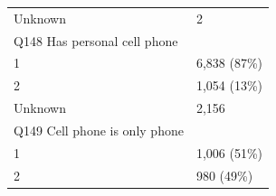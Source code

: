 \documentclass[]{article}
\begin{document}
\begin{longtable}[]{@{}ll@{}}
\begin{minipage}[t]{0.71\columnwidth}
Unknown\strut
\end{minipage} & \begin{minipage}[t]{0.23\columnwidth}\raggedright
2\strut
\end{minipage}\tabularnewline
\begin{minipage}[t]{0.71\columnwidth}\raggedright
Q148 Has personal cell phone\strut
\end{minipage} & \begin{minipage}[t]{0.23\columnwidth}\raggedright
\strut
\end{minipage}\tabularnewline
\begin{minipage}[t]{0.71\columnwidth}\raggedright
1\strut
\end{minipage} & \begin{minipage}[t]{0.23\columnwidth}\raggedright
6,838 (87\%)\strut
\end{minipage}\tabularnewline
\begin{minipage}[t]{0.71\columnwidth}\raggedright
2\strut
\end{minipage} & \begin{minipage}[t]{0.23\columnwidth}\raggedright
1,054 (13\%)\strut
\end{minipage}\tabularnewline
\begin{minipage}[t]{0.71\columnwidth}\raggedright
Unknown\strut
\end{minipage} & \begin{minipage}[t]{0.23\columnwidth}\raggedright
2,156\strut
\end{minipage}\tabularnewline
\begin{minipage}[t]{0.71\columnwidth}\raggedright
Q149 Cell phone is only phone\strut
\end{minipage} & \begin{minipage}[t]{0.23\columnwidth}\raggedright
\strut
\end{minipage}\tabularnewline
\begin{minipage}[t]{0.71\columnwidth}\raggedright
1\strut
\end{minipage} & \begin{minipage}[t]{0.23\columnwidth}\raggedright
1,006 (51\%)\strut
\end{minipage}\tabularnewline
\begin{minipage}[t]{0.71\columnwidth}\raggedright
2\strut
\end{minipage} & \begin{minipage}[t]{0.23\columnwidth}\raggedright
980 (49\%)\strut
\end{minipage}\tabularnewline

\end{longtable}
\end{document}
